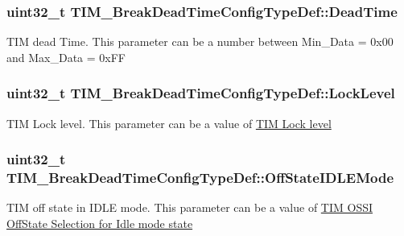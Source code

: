\subsubsection[{\texorpdfstring{Dead\+Time}{DeadTime}}]{\setlength{\rightskip}{0pt plus 5cm}uint32\+\_\+t T\+I\+M\+\_\+\+Break\+Dead\+Time\+Config\+Type\+Def\+::\+Dead\+Time}\hypertarget{struct_t_i_m___break_dead_time_config_type_def_a4bdc5aec84be4b728b55028491f261d4}{}\label{struct_t_i_m___break_dead_time_config_type_def_a4bdc5aec84be4b728b55028491f261d4}
T\+IM dead Time. This parameter can be a number between Min\+\_\+\+Data = 0x00 and Max\+\_\+\+Data = 0x\+FF 
\subsubsection[{\texorpdfstring{Lock\+Level}{LockLevel}}]{\setlength{\rightskip}{0pt plus 5cm}uint32\+\_\+t T\+I\+M\+\_\+\+Break\+Dead\+Time\+Config\+Type\+Def\+::\+Lock\+Level}\hypertarget{struct_t_i_m___break_dead_time_config_type_def_ab00ae9fa5c6daa6319883863dee6e40a}{}\label{struct_t_i_m___break_dead_time_config_type_def_ab00ae9fa5c6daa6319883863dee6e40a}
T\+IM Lock level. This parameter can be a value of \hyperlink{group___t_i_m___lock__level}{T\+IM Lock level} 
\subsubsection[{\texorpdfstring{Off\+State\+I\+D\+L\+E\+Mode}{OffStateIDLEMode}}]{\setlength{\rightskip}{0pt plus 5cm}uint32\+\_\+t T\+I\+M\+\_\+\+Break\+Dead\+Time\+Config\+Type\+Def\+::\+Off\+State\+I\+D\+L\+E\+Mode}\hypertarget{struct_t_i_m___break_dead_time_config_type_def_a49f39e31ac019b9b7a20751bfd01c6c4}{}\label{struct_t_i_m___break_dead_time_config_type_def_a49f39e31ac019b9b7a20751bfd01c6c4}
T\+IM off state in I\+D\+LE mode. This parameter can be a value of \hyperlink{group___t_i_m___o_s_s_i___off___state___selection__for___idle__mode__state}{T\+IM O\+S\+SI Off\+State Selection for Idle mode state} 
